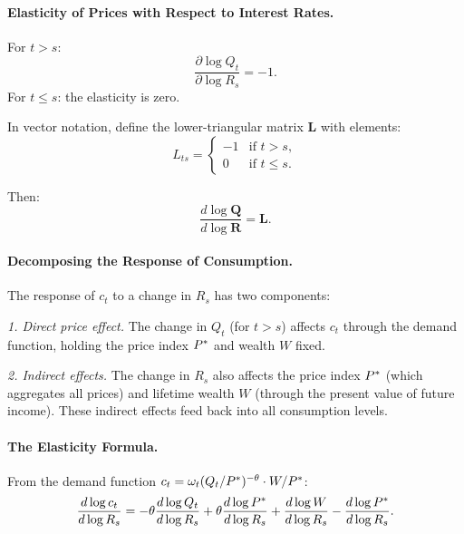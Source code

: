 \paragraph{Elasticity of Prices with Respect to Interest Rates.}
For $t > s$:
\begin{equation}
\frac{\partial \log Q_t}{\partial \log R_s} = -1.
\label{eq:Q-R-elasticity}
\end{equation}
For $t \leq s$: the elasticity is zero.

In vector notation, define the lower-triangular matrix $\mathbf{L}$ with elements:
\begin{equation}
L_{ts} = \begin{cases} -1 & \text{if } t > s, \\ 0 & \text{if } t \leq s. \end{cases}
\label{eq:L-matrix}
\end{equation}

Then:
\begin{equation}
\frac{d \log \mathbf{Q}}{d \log \mathbf{R}} = \mathbf{L}.
\label{eq:Q-R-matrix}
\end{equation}

\paragraph{Decomposing the Response of Consumption.}
The response of $c_t$ to a change in $R_s$ has two components:

\medskip
\noindent
\textit{1. Direct price effect.} The change in $Q_t$ (for $t > s$) affects $c_t$ through the demand function, holding the price index $P^{*}$ and wealth $W$ fixed.

\medskip
\noindent
\textit{2. Indirect effects.} The change in $R_s$ also affects the price index $P^{*}$ (which aggregates all prices) and lifetime wealth $W$ (through the present value of future income). These indirect effects feed back into all consumption levels.

\paragraph{The Elasticity Formula.}
From the demand function $c_t = \omega_t (Q_t / P^{*})^{-\theta} \cdot W / P^{*}$:
\begin{equation}
\frac{d \log c_t}{d \log R_s} = -\theta \frac{d \log Q_t}{d \log R_s} + \theta \frac{d \log P^{*}}{d \log R_s} + \frac{d \log W}{d \log R_s} - \frac{d \log P^{*}}{d \log R_s}.
\label{eq:consumption-elasticity-decomp}
\end{equation}

